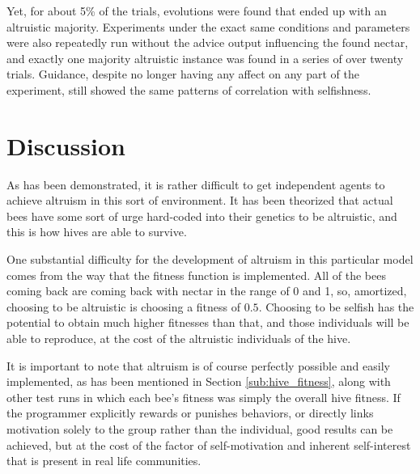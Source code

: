 \documentclass[twoside]{article}
\begin{document}
\begin{multicols}{2}
            Yet, for about 5\% of the trials, evolutions were found that ended up with an altruistic majority. Experiments under the exact same conditions and parameters were also repeatedly run without the advice output influencing the found nectar, and exactly one majority altruistic instance was found in a series of over twenty trials. Guidance, despite no longer having any affect on any part of the experiment, still showed the same patterns of correlation with selfishness.  


	\section{Discussion} %
	\label{sec:discussion}

		As has been demonstrated, it is rather difficult to get independent agents to achieve altruism in this sort of environment. It has been theorized that actual bees have some sort of urge hard-coded into their genetics to be altruistic, and this is how hives are able to survive. \cite{macy}

		One substantial difficulty for the development of altruism in this particular model comes from the way that the fitness function is implemented. All of the bees coming back are coming back with nectar in the range of 0 and 1, so, amortized, choosing to be altruistic is choosing a fitness of $0.5$. Choosing to be selfish has the potential to obtain much higher fitnesses than that, and those individuals will be able to reproduce, at the cost of the altruistic individuals of the hive.

		It is important to note that altruism is of course perfectly possible and easily implemented, as has been mentioned in Section \ref{sub:hive_fitness}, along with other test runs in which each bee's fitness was simply the overall hive fitness. If the programmer explicitly rewards or punishes behaviors, or directly links motivation solely to the group rather than the individual, good results can be achieved, but at the cost of the factor of self-motivation and inherent self-interest that is present in real life communities. 


\end{multicols}
\end{document}
